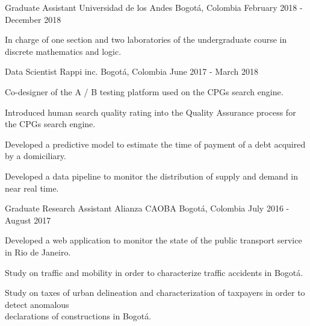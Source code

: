 \begin{cventries}
    \cventry
    {Graduate Assistant}
    {Universidad de los Andes}
    {Bogotá, Colombia}
    {February 2018 - December 2018}
    {
        \begin{cvitems}
        \item{In charge of one section and two laboratories of the undergraduate course in discrete mathematics and logic.}
        \end{cvitems}
    }

    \cventry
    {Data Scientist} %
    {Rappi inc.} %
    {Bogotá, Colombia} %
    {June 2017 - March 2018} %
    {
        \begin{cvitems}
        \item{Co-designer of the A / B testing platform used on the CPGs search engine.}
        \item{Introduced human search quality rating into the Quality Assurance process for the CPGs search engine.}
        \item{Developed a predictive model to estimate the time of payment of a debt acquired by a domiciliary.}
        \item{Developed a data pipeline to monitor the distribution of supply and demand in near real time.}
        \end{cvitems}
    } %


    \cventry
    {Graduate Research Assistant} %
    {Alianza CAOBA} %
    {Bogotá, Colombia} %
    {July 2016 - August 2017} %
    {
        \begin{cvitems}
        \item{Developed a web application to monitor the state of the public transport service in Rio de Janeiro.}
        \item{Study on traffic and mobility in order to characterize traffic accidents in Bogotá.}
        \item{Study on taxes of urban delineation and characterization of taxpayers in order to detect anomalous \\declarations of constructions in Bogotá.}
        \end{cvitems}
    } %


    \vspace{-0.5cm}
\end{cventries}
